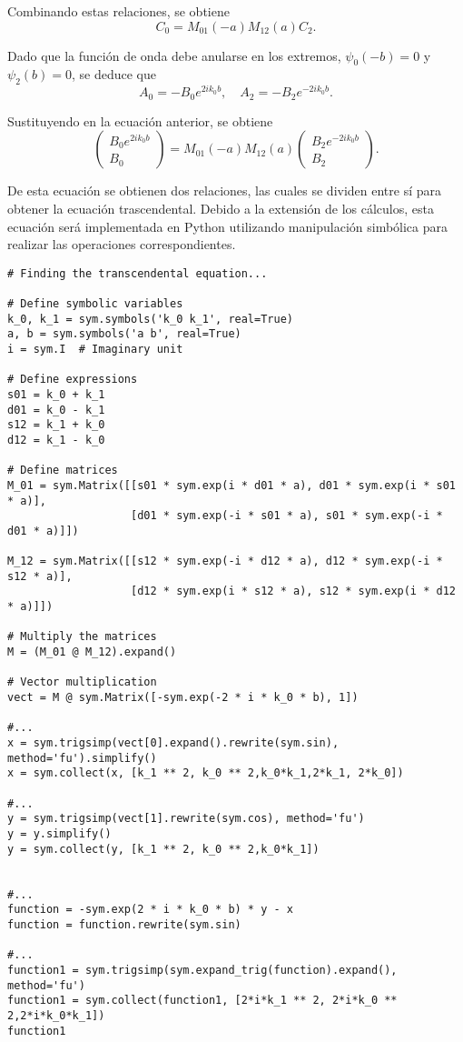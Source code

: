 \documentclass[11pt]{article}
\begin{document}
Combinando estas relaciones, se obtiene
$$ C_0 = M_{01}(-a)M_{12}(a)C_2. $$

Dado que la función de onda debe anularse en los extremos, \(\psi_0(-b) = 0\) y
\(\psi_2(b) = 0\), se deduce que
$$ A_0 = - B_0 e^{2ik_0b}, \quad A_2 = - B_2 e^{-2ik_0b}.
$$

Sustituyendo en la ecuación anterior, se obtiene
$$
 \begin{pmatrix} B_0 e^{2ik_0b} \\ B_0 \end{pmatrix} =
 M_{01}(-a) M_{12}(a) \begin{pmatrix} B_2 e^{-2ik_0b} \\ B_2 \end{pmatrix}.
$$

De esta ecuación se obtienen dos relaciones, las cuales se dividen entre
sí para obtener la ecuación trascendental. Debido a la extensión de los
cálculos, esta ecuación será implementada en Python utilizando
manipulación simbólica para realizar las operaciones correspondientes.
\begin{verbatim}
# Finding the transcendental equation...

# Define symbolic variables
k_0, k_1 = sym.symbols('k_0 k_1', real=True)
a, b = sym.symbols('a b', real=True)
i = sym.I  # Imaginary unit

# Define expressions
s01 = k_0 + k_1
d01 = k_0 - k_1
s12 = k_1 + k_0
d12 = k_1 - k_0

# Define matrices
M_01 = sym.Matrix([[s01 * sym.exp(i * d01 * a), d01 * sym.exp(i * s01 * a)],
                   [d01 * sym.exp(-i * s01 * a), s01 * sym.exp(-i * d01 * a)]])

M_12 = sym.Matrix([[s12 * sym.exp(-i * d12 * a), d12 * sym.exp(-i * s12 * a)],
                   [d12 * sym.exp(i * s12 * a), s12 * sym.exp(i * d12 * a)]])

# Multiply the matrices
M = (M_01 @ M_12).expand()

# Vector multiplication
vect = M @ sym.Matrix([-sym.exp(-2 * i * k_0 * b), 1])

#...
x = sym.trigsimp(vect[0].expand().rewrite(sym.sin), method='fu').simplify()
x = sym.collect(x, [k_1 ** 2, k_0 ** 2,k_0*k_1,2*k_1, 2*k_0])

#...
y = sym.trigsimp(vect[1].rewrite(sym.cos), method='fu')
y = y.simplify()
y = sym.collect(y, [k_1 ** 2, k_0 ** 2,k_0*k_1])


#...
function = -sym.exp(2 * i * k_0 * b) * y - x
function = function.rewrite(sym.sin)

#...
function1 = sym.trigsimp(sym.expand_trig(function).expand(), method='fu')
function1 = sym.collect(function1, [2*i*k_1 ** 2, 2*i*k_0 ** 2,2*i*k_0*k_1])
function1
\end{verbatim}
\end{document}
